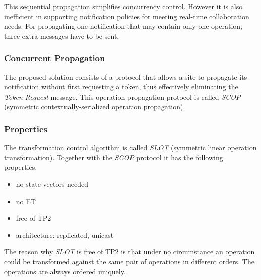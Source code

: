 This sequential propagation simplifies concurrency control. However it is also inefficient in supporting notification policies for meeting real-time collaboration needs. For propagating one notification that may contain only one operation, three extra messages have to be sent.


\subsubsection{Concurrent Propagation}
The proposed solution consists of a protocol that allows a site to propagate its notification without first requesting a token, thus effectively eliminating the \emph{Token-Request} message. This operation propagation protocol is called \emph{SCOP} (symmetric contextually-serialized operation propagation). 


\subsubsection{Properties}
The transformation control algorithm is called \emph{SLOT} (symmetric linear operation transformation). Together with the \emph{SCOP} protocol it has the following properties.

\begin{itemize}
 \item no state vectors needed
 \item no ET
 \item free of TP2
 \item architecture: replicated, unicast
\end{itemize}

The reason why \emph{SLOT} is free of TP2 is that under no circumstance an operation could be transformed against the same pair of operations in different orders. The operations are always ordered uniquely.

